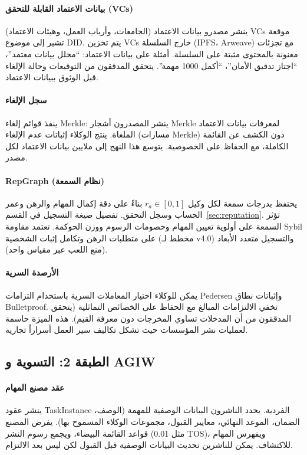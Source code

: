 \documentclass[11pt]{article}
\begin{document}
\paragraph{بيانات الاعتماد القابلة للتحقق (VCs)} ينشر مصدرو بيانات الاعتماد (الجامعات، وأرباب العمل، وهيئات الاعتماد) VCs موقعة تشير إلى موضوع DID. يتم تخزين VCs خارج السلسلة (IPFS، Arweave) مع تجزئات معنونة بالمحتوى مثبتة على السلسلة. أمثلة على بيانات الاعتماد: ``محلل بيانات معتمد''، ``اجتاز تدقيق الأمان''، ``أكمل 1000 مهمة''. يتحقق المدققون من التوقيعات وحالة الإلغاء قبل الوثوق ببيانات الاعتماد.

\paragraph{سجل الإلغاء} ينفذ قوائم إلغاء Merkle: ينشر المصدرون أشجار Merkle لمعرفات بيانات الاعتماد الملغاة. ينتج الوكلاء إثباتات عدم الإلغاء (مسارات Merkle) دون الكشف عن القائمة الكاملة، مع الحفاظ على الخصوصية. يتوسع هذا النهج إلى ملايين بيانات الاعتماد لكل مصدر.

\paragraph{RepGraph (نظام السمعة)} يحتفظ بدرجات سمعة لكل وكيل $r_a \in [0,1]$ بناءً على دقة إكمال المهام والرهن وعمر الحساب وسجل التحقق. تفصيل صيغة التسجيل في القسم~\ref{sec:reputation}. تؤثر السمعة على أولوية تعيين المهام وخصومات الرسوم ووزن الحوكمة. تعتمد مقاومة Sybil على متطلبات الرهن وتكامل إثبات الشخصية (مخطط لـ v4.0) والتسجيل متعدد الأبعاد (منع اللعب عبر مقياس واحد).

\paragraph{الأرصدة السرية} يمكن للوكلاء اختيار المعاملات السرية باستخدام التزامات Pedersen وإثباتات نطاق Bulletproof. تخفي الالتزامات المبالغ مع الحفاظ على الخصائص التماثلية (يتحقق المدققون من أن المدخلات تساوي المخرجات دون معرفة القيم). هذه الميزة حاسمة لعمليات نشر المؤسسات حيث تشكل تكاليف سير العمل أسراراً تجارية.

\subsection{الطبقة 2: التسوية و AGIW}
\paragraph{عقد مصنع المهام} ينشر عقود TaskInstance الفردية. يحدد الناشرون البيانات الوصفية للمهمة (الوصف، الضمان، الموعد النهائي، معايير القبول، مجموعات الوكلاء المسموح بها). يفرض المصنع قواعد القائمة البيضاء، ويجمع رسوم النشر (مثل 0.01 TOS)، ويفهرس المهام للاكتشاف. يمكن للناشرين تحديث البيانات الوصفية قبل القبول لكن ليس بعد الالتزام.
\end{document}
